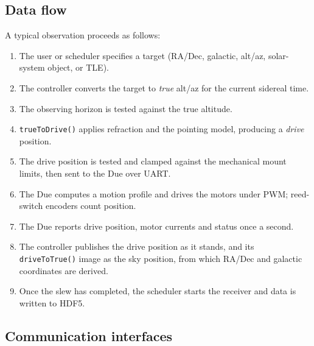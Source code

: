 \documentclass[11pt,a4paper]{article}
\begin{document}
\subsection{Data flow}

A typical observation proceeds as follows:

\begin{enumerate}
    \item The user or scheduler specifies a target (RA/Dec, galactic, alt/az, solar-system object, or TLE).
    \item The controller converts the target to \emph{true} alt/az for the current sidereal time.
    \item The observing horizon is tested against the true altitude.
    \item \texttt{trueToDrive()} applies refraction and the pointing model, producing a \emph{drive} position.
    \item The drive position is tested and clamped against the mechanical mount limits, then sent to the Due over UART.
    \item The Due computes a motion profile and drives the motors under PWM; reed-switch encoders count position.
    \item The Due reports drive position, motor currents and status once a second.
    \item The controller publishes the drive position as it stands, and its \texttt{driveToTrue()} image as the sky position, from which RA/Dec and galactic coordinates are derived.
    \item Once the slew has completed, the scheduler starts the receiver and data is written to HDF5.
\end{enumerate}

\subsection{Communication interfaces}
\end{document}
